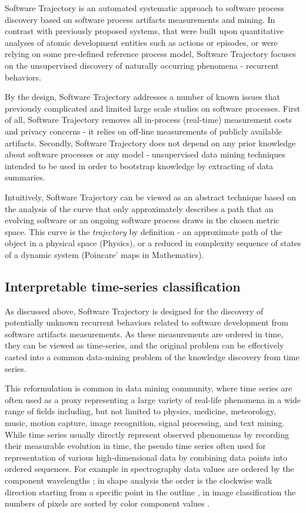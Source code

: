 Software Trajectory is an automated systematic approach to software process discovery based on software process 
artifacts measurements and mining. In contrast with previously proposed systems, that were built upon quantitative 
analyses of atomic development entities such as actions or episodes, or were relying on some pre-defined reference 
process model, Software Trajectory focuses on the unsupervised discovery of naturally occurring phenomena 
- recurrent behaviors. 

By the design, Software Trajectory addresses a number of known issues that previously complicated and limited 
large scale studies on software processes.
First of all, Software Trajectory removes all in-process (real-time) measurement costs and privacy concerns - it relies 
on off-line measurements of publicly available artifacts. 
Secondly, Software Trajectory does not depend on any prior knowledge about software processes or any model - 
unsupervised data mining techniques intended to be used in order to bootstrap knowledge by extracting of data 
summaries. 

Intuitively, Software Trajectory can be viewed as an abstract technique based on the analysis of the curve that only 
approximately describes a path that an evolving software or an ongoing software process draws in the chosen 
metric space. 
This curve is the \textit{trajectory} by definition - an approximate path of the object in a physical space (Physics), 
or a reduced in complexity sequence of states of a dynamic system (Poincare' maps in Mathematics). 

%
%
\subsection{Interpretable time-series classification}\label{sec_knowledge_discovery}
As discussed above, Software Trajectory is designed for the discovery of potentially unknown recurrent 
behaviors related to software development from software artifacts measurements. As these measurements 
are ordered in time, they can be viewed as time-series, and the original problem can be effectively casted
into a common data-mining problem of the knowledge discovery from time series.

This reformulation is common in data mining community, where time series are often used as a proxy 
representing a large variety of real-life phenomena in a wide range of fields including, but not limited to physics, 
medicine, meteorology, music, motion capture, image recognition, signal processing, and text mining. 
While time series usually directly represent observed phenomenas by recording their measurable evolution 
in time, the pseudo time series often used for representation of various high-dimensional data 
by combining data points into ordered sequences. 
For example in spectrography data values are ordered by the component wavelengths \cite{citeulike:12550833};
in shape analysis the order is the clockwise walk direction starting from a specific point in the outline 
\cite{citeulike:12550835}, in image classification the numbers of pixels are sorted by color component 
values \cite{citeulike:2900542}.

